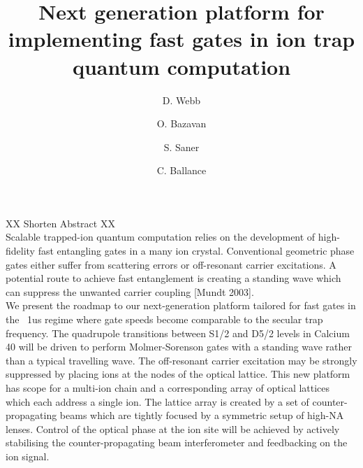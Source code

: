 \documentclass[final]{beamer}
\title[FastGates]{\huge Next generation platform for implementing fast gates in ion trap quantum computation}
\author[]{\large D. Webb \and O. Bazavan \and S. Saner \and C. Ballance}
\institute[]{\Large
Ion Trap Quantum Computing Group
Department of Physics, University of Oxford}
\begin{document}
\begin{frame}{} 

\maketitle



\begin{center}

    \begin{block}{}
      XX Shorten Abstract XX\\
    Scalable trapped-ion quantum computation relies on the development of
    high-fidelity fast entangling gates in a many ion
    crystal. Conventional geometric phase gates either suffer from
    scattering errors or off-resonant carrier excitations. A potential
    route to achieve fast entanglement is creating a standing wave which
    can suppress the unwanted carrier coupling [Mundt 2003]. \\

    We present the roadmap to our next-generation platform tailored for
    fast gates in the ~1us regime where gate speeds become comparable to
    the secular trap frequency. The quadrupole transitions between S1/2
    and D5/2 levels in Calcium 40 will be driven to perform
    Molmer-Sorenson gates with a standing wave rather than a typical
    travelling wave. The off-resonant carrier excitation may be strongly
    suppressed by placing ions at the nodes of the optical lattice. This
    new platform has scope for a multi-ion chain and a corresponding array
    of optical lattices which each address a single ion. The lattice array
    is created by a set of counter-propagating beams which are tightly
    focused by a symmetric setup of high-NA lenses. Control of the optical
    phase at the ion site will be achieved by actively stabilising the
    counter-propagating beam interferometer and feedbacking on the ion
    signal.
    \end{block}


\begin{columns}[t]
  \begin{column}{0.49\textwidth}


\end{column}
\end{columns}
\end{center}
\end{frame}
\end{document}
